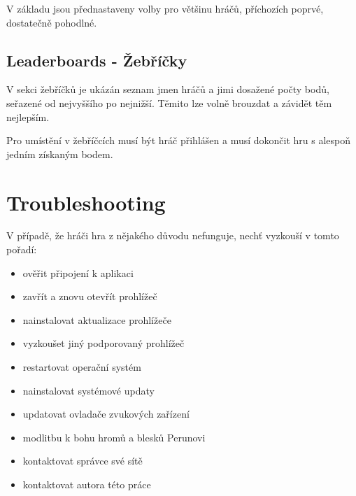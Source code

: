 V základu jsou přednastaveny volby pro většinu hráčů, příchozích poprvé, dostatečně pohodlné.

\subsection{Leaderboards - Žebříčky}

V sekci žebříčků je ukázán seznam jmen hráčů a jimi dosažené počty bodů, seřazené od nejvyššího po nejnižší. Těmito lze volně brouzdat a závidět těm nejlepším.

Pro umístění v žebříčcích musí být hráč přihlášen a musí dokončit hru s alespoň jedním získaným bodem.

\section{Troubleshooting}

V případě, že hráči hra z nějakého důvodu nefunguje, nechť vyzkouší v tomto pořadí:

\begin{itemize}
\item ověřit připojení k aplikaci
\item zavřít a znovu otevřít prohlížeč
\item nainstalovat aktualizace prohlížeče
\item vyzkoušet jiný podporovaný prohlížeč
\item restartovat operační systém
\item nainstalovat systémové updaty
\item updatovat ovladače zvukových zařízení
\item modlitbu k bohu hromů a blesků Perunovi
\item kontaktovat správce své sítě
\item kontaktovat autora této práce
\end{itemize}
